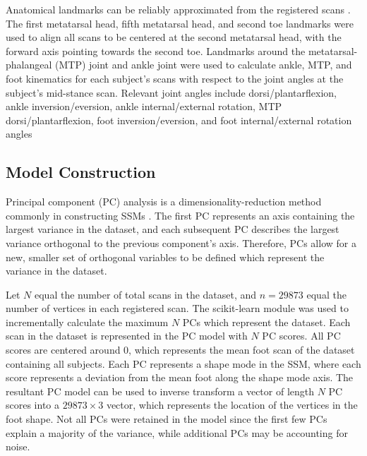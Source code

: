 \documentclass[preprint]{elsarticle}
\begin{document}
Anatomical landmarks can be reliably approximated from the registered scans \citep{VandenHerrewegen2014b}.
The first metatarsal head, fifth metatarsal head, and second toe landmarks were used to align all scans to be centered at the second metatarsal head, with the forward axis pointing towards the second toe.
Landmarks around the metatarsal-phalangeal (MTP) joint and ankle joint were used to calculate ankle, MTP, and foot kinematics for each subject's scans with respect to the joint angles at the subject's mid-stance scan.
Relevant joint angles include dorsi/plantarflexion, ankle inversion/eversion, ankle internal/external rotation, MTP dorsi/plantarflexion, foot inversion/eversion, and foot internal/external rotation angles

\hypertarget{model-construction}{%
\subsection{Model Construction}\label{model-construction}}

Principal component (PC) analysis is a dimensionality-reduction method commonly in constructing SSMs \citep{Reed2008, Park2015a, Conrad2019, Stankovic2020}.
The first PC represents an axis containing the largest variance in the dataset, and each subsequent PC describes the largest variance orthogonal to the previous component's axis.
Therefore, PCs allow for a new, smaller set of orthogonal variables to be defined which represent the variance in the dataset.

Let \(N\) equal the number of total scans in the dataset, and \(n=29873\) equal the number of vertices in each registered scan. The scikit-learn module \citep{JMLR:v12:pedregosa11a} was used to incrementally calculate the maximum \(N\) PCs which represent the dataset.
Each scan in the dataset is represented in the PC model with \(N\) PC scores.
All PC scores are centered around 0, which represents the mean foot scan of the dataset containing all subjects.
Each PC represents a shape mode in the SSM, where each score represents a deviation from the mean foot along the shape mode axis. The resultant PC model can be used to inverse transform a vector of length \(N\) PC scores into a \(29873\times 3\) vector, which represents the location of the vertices in the foot shape. Not all PCs were retained in the model since the first few PCs explain a majority of the variance, while additional PCs may be accounting for noise.
\end{document}
